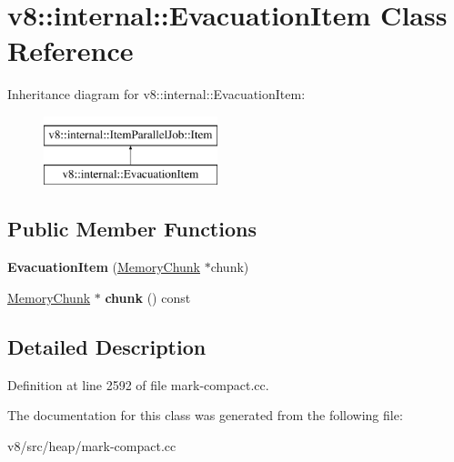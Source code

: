 \hypertarget{classv8_1_1internal_1_1EvacuationItem}{}\section{v8\+:\+:internal\+:\+:Evacuation\+Item Class Reference}
\label{classv8_1_1internal_1_1EvacuationItem}
Inheritance diagram for v8\+:\+:internal\+:\+:Evacuation\+Item\+:\begin{figure}[H]
\begin{center}
\leavevmode
\includegraphics[height=2.000000cm]{classv8_1_1internal_1_1EvacuationItem}
\end{center}
\end{figure}
\subsection*{Public Member Functions}
\begin{DoxyCompactItemize}
\item 
\mbox{\label{classv8_1_1internal_1_1EvacuationItem_a60a5fd94023225eb32ad6bce9ed40aa0}} 
{\bfseries Evacuation\+Item} (\mbox{\hyperlink{classv8_1_1internal_1_1MemoryChunk}{Memory\+Chunk}} $\ast$chunk)
\item 
\mbox{\label{classv8_1_1internal_1_1EvacuationItem_ac2d046685f9443fc657b740b5a312eb7}} 
\mbox{\hyperlink{classv8_1_1internal_1_1MemoryChunk}{Memory\+Chunk}} $\ast$ {\bfseries chunk} () const
\end{DoxyCompactItemize}


\subsection{Detailed Description}


Definition at line 2592 of file mark-\/compact.\+cc.



The documentation for this class was generated from the following file\+:\begin{DoxyCompactItemize}
\item 
v8/src/heap/mark-\/compact.\+cc\end{DoxyCompactItemize}
